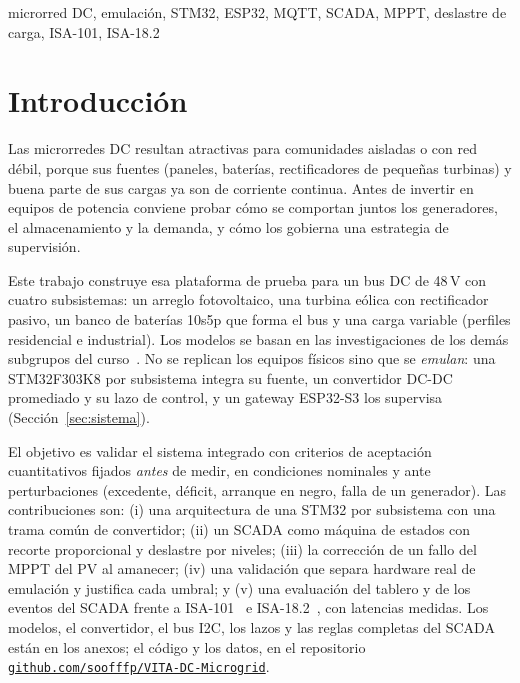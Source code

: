 \documentclass[conference]{IEEEtran}
\begin{document}
\begin{IEEEkeywords}
microrred DC, emulación, STM32, ESP32, MQTT, SCADA, MPPT, deslastre de carga, ISA-101, ISA-18.2
\end{IEEEkeywords}

\section{Introducción}

Las microrredes DC resultan atractivas para comunidades aisladas o con red débil, porque sus fuentes (paneles, baterías, rectificadores de pequeñas turbinas) y buena parte de sus cargas ya son de corriente continua. Antes de invertir en equipos de potencia conviene probar cómo se comportan juntos los generadores, el almacenamiento y la demanda, y cómo los gobierna una estrategia de supervisión.

Este trabajo construye esa plataforma de prueba para un bus DC de 48\,V con cuatro subsistemas: un arreglo fotovoltaico, una turbina eólica con rectificador pasivo, un banco de baterías 10s5p que forma el bus y una carga variable (perfiles residencial e industrial). Los modelos se basan en las investigaciones de los demás subgrupos del curso~\cite{aristizabal2026pv,gonzalez2026eolica,vega2026bateria,hernandez2026carga}. No se replican los equipos físicos sino que se \emph{emulan}: una STM32F303K8 por subsistema integra su fuente, un convertidor DC-DC promediado y su lazo de control, y un gateway ESP32-S3 los supervisa (Sección~\ref{sec:sistema}).

El objetivo es validar el sistema integrado con criterios de aceptación cuantitativos fijados \emph{antes} de medir, en condiciones nominales y ante perturbaciones (excedente, déficit, arranque en negro, falla de un generador). Las contribuciones son: (i) una arquitectura de una STM32 por subsistema con una trama común de convertidor; (ii) un SCADA como máquina de estados con recorte proporcional y deslastre por niveles; (iii) la corrección de un fallo del MPPT del PV al amanecer; (iv) una validación que separa hardware real de emulación y justifica cada umbral; y (v) una evaluación del tablero y de los eventos del SCADA frente a ISA-101~\cite{isa101} e ISA-18.2~\cite{isa182}, con latencias medidas. Los modelos, el convertidor, el bus I2C, los lazos y las reglas completas del SCADA están en los anexos; el código y los datos, en el repositorio \href{https://github.com/soofffp/VITA-DC-Microgrid}{\texttt{github.com/soofffp/VITA-DC-Microgrid}}.
\end{document}
